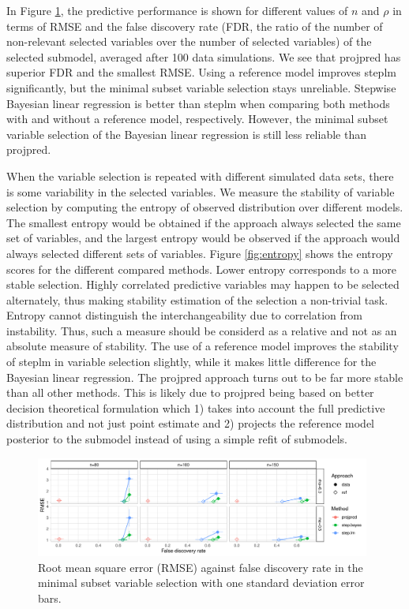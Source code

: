 \documentclass[a4]{article}
\theoremstyle{definition}
\begin{document}
In Figure \ref{fig:rmse_vs_fdr}, the predictive performance is shown
for different values of $n$ and $\rho$ in terms of RMSE and the false discovery rate (FDR, the ratio of the number of non-relevant selected
variables over the number of selected variables) of the selected submodel,
averaged after 100 data simulations. We see that projpred has superior FDR and the
smallest RMSE. Using a reference model improves steplm significantly,
but the minimal subset variable selection stays unreliable. Stepwise
Bayesian linear regression is better than steplm when comparing both methods with
and without a reference model, respectively. However, the minimal subset variable
selection of the Bayesian linear regression is still less reliable than projpred.

When the variable selection is repeated with different simulated data
sets, there is some variability in the selected variables. We
measure the stability of variable selection by computing the entropy
of observed distribution over different models. The smallest entropy
would be obtained if the approach always selected the same set of
variables, and the largest entropy would be observed if the approach
would always selected different sets of variables.
Figure \ref{fig:entropy} shows the entropy scores for the different compared
methods. Lower entropy corresponds to a more stable
selection. Highly correlated predictive variables may happen to be
selected alternately, thus making stability estimation of the
selection a non-trivial task. Entropy cannot distinguish the interchangeability 
due to correlation from instability. Thus, such a measure should be 
considerd as a relative and not as an absolute measure of stability.
The use of a reference model
improves the stability of steplm in variable selection slightly, while it makes
little difference for the Bayesian linear regression. The
projpred approach turns out to be far more stable than all
other methods. This is likely due to projpred being based on better
decision theoretical formulation which 1) takes into account the full
predictive distribution and not just point estimate and 2) projects
the reference model posterior to the submodel instead of using a
simple refit of submodels.

\begin{figure}[tp]
  \centering
  \includegraphics[width=0.98\textwidth]{graphics/rmse_vs_fdr_parallel.pdf}
  \caption{Root mean square error (RMSE) against false discovery rate in the minimal subset variable selection with one standard deviation error bars.}
  \label{fig:rmse_vs_fdr}
\end{figure}
\end{document}
